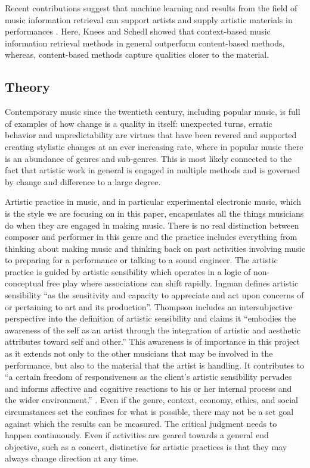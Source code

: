 \documentclass[runningheads,a4paper]{cmmr2023}
\begin{document}
Recent contributions suggest that machine learning and results from the field of music information retrieval can support artists and supply artistic materials in performances \cite{ordiales2017,roma2021}. Here, Knees and Schedl \cite{knees16_contex_music_simil_index_retriev} showed that context-based music information retrieval methods in general outperform content-based methods, whereas, content-based methods capture qualities closer to the material.


\subsection{Theory}
Contemporary music since the twentieth century, including popular music, is full of examples of how change is a quality in itself: unexpected turns, erratic behavior and unpredictability are virtues that have been revered and supported creating stylistic changes at an ever increasing rate, where in popular music there is an abundance of genres and sub-genres. This is most likely connected to the fact that artistic work in general is engaged in multiple methods and is governed by change and difference to a large degree.

Artistic practice in music, and in particular experimental electronic music, which is the style we are focusing on in this paper, encapsulates all the things musicians do when they are engaged in making music. There is no real distinction between composer and performer in this genre and the practice includes everything from thinking about making music and thinking back on past activities involving music to preparing for a performance or talking to a sound engineer. 
The artistic practice is guided by artistic sensibility which operates in a logic of non-conceptual free play where associations can shift rapidly. Ingman \cite{Ingman2022} defines artistic sensibility “as the sensitivity and capacity to appreciate and act upon concerns of or pertaining to art and its production”. Thompson \cite{Thompson2009} includes an intersubjective perspective into the definition of artistic sensibility and claims it “embodies the awareness of the self as an artist through the integration of artistic and aesthetic attributes toward self and other.” This awareness is of importance in this project as it extends not only to the other musicians that may be involved in the performance, but also to the material that the artist is handling. It contributes to “a certain freedom of responsiveness as the client's artistic sensibility pervades and informs affective and cognitive reactions to his or her internal process and the wider environment.” \cite{Thompson2009}. 
Even if the genre, context, economy, ethics, and social circumstances set the confines for what is possible, there may not be a set goal against which the results can be measured. The critical judgment needs to happen continuously. Even if activities are geared towards a general end objective, such as a concert, distinctive for artistic practices is that they may always change direction at any time.
\end{document}
